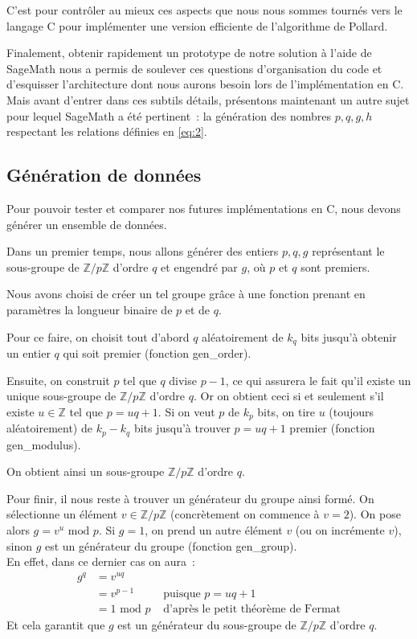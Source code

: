         C'est pour contrôler au mieux ces aspects que nous nous sommes tournés vers le langage C pour implémenter une version efficiente de l'algorithme de Pollard.

        Finalement, obtenir rapidement un prototype de notre solution à l'aide de SageMath nous a permis de soulever ces questions d'organisation du code et d'esquisser l'architecture dont nous aurons besoin lors de l'implémentation en C.
        Mais avant d'entrer dans ces subtils détails, présentons maintenant un autre sujet pour lequel SageMath a été pertinent~: la génération des nombres $p, q, g, h$ respectant les relations définies en \eqref{eq:2}.

        \subsection{Génération de données}
        \label{chapter2:sagemath:data}
        Pour pouvoir tester et comparer nos futures implémentations en C, nous devons générer un ensemble de données.

        Dans un premier temps, nous allons générer des entiers $p, q, g$ représentant le sous-groupe de $\mathbb{Z}/p\mathbb{Z}$ d'ordre $q$ et engendré par $g$, où $p$ et $q$ sont premiers.

        Nous avons choisi de créer un tel groupe grâce à une fonction prenant en paramètres la longueur binaire de $p$ et de $q$.

        Pour ce faire, on choisit tout d'abord $q$ aléatoirement de $k_q$ bits jusqu'à obtenir un entier $q$ qui soit premier (fonction gen\_order).

        Ensuite, on construit $p$ tel que $q$ divise $p - 1$, ce qui assurera le fait qu'il existe un unique sous-groupe de $\mathbb{Z}/p\mathbb{Z}$ d'ordre $q$. Or on obtient ceci si et seulement s'il existe $u \in\mathbb{Z}$ tel que $p = uq + 1$. Si on veut $p$ de $k_p$ bits, on tire $u$ (toujours aléatoirement) de $k_p - k_q$ bits jusqu'à trouver $p = uq + 1$ premier (fonction gen\_modulus).

        On obtient ainsi un sous-groupe $\mathbb{Z}/p\mathbb{Z}$ d'ordre $q$.

        Pour finir, il nous reste à trouver un générateur du groupe ainsi formé. On sélectionne un élément $v \in \mathbb{Z}/p\mathbb{Z}$ (concrètement on commence à $v = 2$). On pose alors $g = v^u \text{ mod } p$. Si $g = 1$, on prend un autre élément $v$ (ou on incrémente $v$), sinon $g$ est un générateur du groupe (fonction gen\_group).\\
        En effet, dans ce dernier cas on aura~:
        \begin{align*}
        g^q & = v^{uq} \\
            & = v^{p-1} & \text{ puisque } p = uq + 1 \\
            & = 1 \text{ mod } p & \text{ d'après le petit théorème de Fermat}
        \end{align*}
        Et cela garantit que $g$ est un générateur du sous-groupe de $\mathbb{Z}/p\mathbb{Z}$ d'ordre $q$.\\

